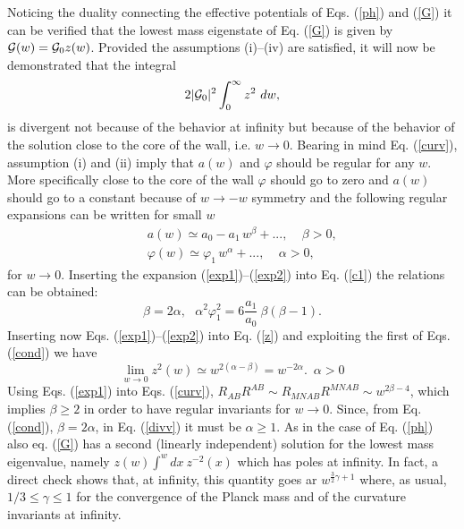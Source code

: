 \documentclass[a4paper,12pt]{article}
\begin{document}
Noticing the duality connecting the effective 
potentials of Eqs. (\ref{ph}) and (\ref{G}) it can be
verified that the lowest mass eigenstate of Eq. (\ref{G}) is 
given by ${\cal G}(w)= {\cal G}_0 z(w)$.  
Provided the assumptions (i)--(iv) are satisfied,
it will now be demonstrated that the integral
\begin{equation}
2 |{\cal G}_{0}|^2 \int_{0}^{\infty} z^2 ~dw,
\end{equation}
is divergent not because of the behavior  at infinity
but because of the behavior of the solution close to the core 
of the wall, i.e. $w\rightarrow 0$. 
Bearing in mind Eq. (\ref{curv}),
assumption (i) and (ii) imply that $a(w)$ and $\varphi$ 
should be regular for any $w$. More specifically
close to the core of the wall $\varphi$ should go to zero 
and  $a(w)$ should go to a 
constant because of $w\rightarrow - w$ 
symmetry and the following regular expansions can be written
for small $w$
\begin{eqnarray}
&& a(w) \simeq a_0 - a_1\, w^{\beta} + ..., ~~~~~\beta>0,
\label{exp1}\\
&& \varphi(w) \simeq \varphi_1\,w^{\alpha} +..., ~~~~~\alpha >0,
\label{exp2}
\end{eqnarray}
for $w\rightarrow 0$. Inserting 
the expansion (\ref{exp1})--(\ref{exp2}) 
into Eq. (\ref{c1}) the relations can be obtained:
\begin{equation}
\beta = 2\alpha, \,\,\,\, \alpha^2 \varphi_1^2 = 6 \frac{a_1}{a_0} 
~\beta(\beta-1).
\label{cond}
\end{equation}
Inserting now Eqs. (\ref{exp1})--(\ref{exp2}) into Eq. (\ref{z}) 
and exploiting the first of Eqs. (\ref{cond}) we have
\begin{equation}
\lim_{w\rightarrow 0} z^2(w) \simeq w^{2 (\alpha - \beta)} = w^{-2\alpha}.
\,\,\,\alpha >0
\label{divv}
\end{equation}
Using Eqs. (\ref{exp1}) into 
Eqs. (\ref{curv}), $R_{A B} R^{A B} \sim 
R_{M N A B} R^{ M N A B} \sim w^{ 2 \beta -4}$, which implies $\beta \geq 2$ 
in order to have regular invariants for $w \rightarrow 0$.  
Since, from Eq. (\ref{cond}),  $\beta = 2\alpha$, in Eq. (\ref{divv})  
it must be $\alpha \geq 1$.
As in the case of Eq. (\ref{ph}) also eq. (\ref{G}) has a second 
(linearly independent) solution for the lowest mass eigenvalue, namely 
$z(w) \int^{w} dx~z^{-2}(x)$ which has poles at infinity.  
In fact, a direct check shows that, at infinity, this quantity
 goes ar $w^{\frac{3}{2}\gamma+ 1}$ where, as usual, 
$1/3\leq\gamma\leq 1$ for the convergence of the Planck mass and of the 
curvature invariants at infinity. 
\end{document}
